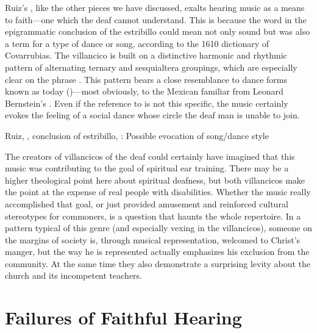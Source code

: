 Ruiz's , like the other pieces we have discussed, exalts hearing music as a means to faith---one which the deaf cannot understand.
This is because the word  in the epigrammatic conclusion of the estribillo could mean not only sound but was also a term for a type of dance or song, according to the 1610 dictionary of Covarrubias.
The villancico is built on a distinctive harmonic and rhythmic pattern of alternating ternary and sesquialtera groupings, which are especially clear on the phrase .
This pattern bears a close resemblance to dance forms known as  today ()---most obviously, to the Mexican  familiar from Leonard Bernstein's .%
\Autocite[]{Grove}
Even if the reference to  is not this specific, the music certainly evokes the feeling of a social dance whose circle the deaf man is unable to join.


\begin{exmusic}
  \caption{Ruiz, , conclusion of estribillo, : Possible evocation of  song/dance style}
  \label{exmusic:Ruiz-Sordos-son}
\end{exmusic}

The creators of villancicos of the deaf could certainly have imagined that this music was contributing to the goal of spiritual ear training.
There may be a higher theological point here about spiritual deafness, but both  villancicos make the point at the expense of real people with disabilities.
Whether the music really accomplished that goal, or just provided amusement and reinforced cultural stereotypes for commoners, is a question that haunts the whole repertoire.
In a pattern typical of this genre (and especially vexing in the  villancicos), someone on the margins of society is, through musical representation, welcomed to Christ's manger, but the way he is represented actually emphasizes his exclusion from the community.
At the same time they also demonstrate a surprising levity about the church and its incompetent teachers.


\section{Failures of Faithful Hearing}

